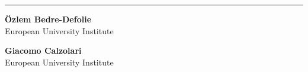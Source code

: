 \hrule %
\vspace{3mm}

\noindent
\begin{minipage}[t]{0.47\textwidth}
    \raggedright
    \textbf{Özlem Bedre-Defolie} \\
    European University Institute \\
\end{minipage}%
\hfill
\begin{minipage}[t]{0.47\textwidth}
    \raggedright
    \textbf{Giacomo Calzolari} \\
    European University Institute \\
\end{minipage}%
\vspace{3mm}
